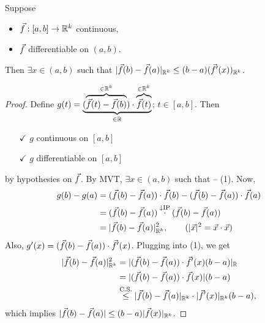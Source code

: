\documentclass[]{article}
\begin{document}
\begin{theorem}
	\label{thm-5-19} Suppose
	\begin{itemize}
		\item $\vf:[a,b]\ra\mb R^k$ continuous,
		\item $\vf$ differentiable on $(a,b)$.
	\end{itemize}
	Then $\exists x\in(a,b)$ such that $|\vf(b)-\vf(a)|_{\mb R^k} \leq (b-a) (\vf'(x))_{\mb R^k}$.
\end{theorem}
\begin{proof}
	Define $g(t) = \ub{\in\mb R}{(\ob{\in\mb R^k}{\vf(t)-\vf(b)})\cdot\ob{\in\mb R^k}{\vf(t)}}$; $t\in[a,b]$.
	Then
	\begin{enumerate}
		\item[$\checkmark$] $g$ continuous on $[a,b]$
		\item[$\checkmark$] $g$ differentiable on $[a,b]$
	\end{enumerate}
	by hypothesies on $\vf$.
	By MVT, $\exists x\in(a,b)$ such that  -- (1).
	Now, 
	\begin{align*}
		g(b)-g(a) &= (\vf(b)-\vf(a))\cdot\vf(b) - (\vf(b)-\vf(a))\cdot\vf(a) \\
				  &= (\vf(b)-\vf(a))\os{\downarrow\text{IP}}\cdot(\vf(b)-\vf(a)) \\
				  &= |\vf(b)-\vf(a)|_{\mb R^k}^2, \qquad (|\vx|^2=\vx\cdot\vx)
	\end{align*}
	Also, $g'(x) = (\vf(b)-\vf(a)) \cdot \vf'(x)$.
	Plugging into (1), we get 
	\begin{align*}
		|\vf(b)-\vf(a)|_{\mb R^k}^2 &= |(\vf(b)-\vf(a))\cdot \vf'(x)(b-a)|_{\mb R} \\
									&= |(\vf(b)-\vf(a))\cdot\vf(x)|(b-a) \\
									&\os{\text{C.S.}}\leq |\vf(b)-\vf(a)|_{\mb R^k}\cdot |\vf'(x)|_{\mb R^k}(b-a),
	\end{align*}
	which implies $|\vf(b)-\vf(a)|\leq(b-a)|\vf(x)|_{\mb R^k}$.
\end{proof}

\iffalse
\begin{example}
	[HW \#4.2]
	$f:[0,\infty)\ra\mb R$ is: $\dots$.
	Show, $g(x) = \frac{f(x)}x$ is monotonically increasing.
\end{example}
\begin{proof}
	Consider $f:[0,\infty)\ra\mb R$ is a continuous function with the given properties.
	Since $f$ is differentiable on $(0,\infty)$, $\exists t\in(0,x)$, $x<\infty$ such that $\frac{f(x)-f(0)}x = f'(t)$ -- (I) by MVT.
	Likewise for the interval $(x,y)$, $y<\infty$, $\exists s$ such that $f'(s) = \frac{f(y)-f(x)}{y-x}$ -- (II).
	So, $s>t$ and by monotonicity of $f'$, $$f'(s)\geq f'(t) \implies \frac{f(y)-f(x)}{y-x} \geq \frac{f(x)}x. $$
	$xf(y) - xf(y) \geq (y-x) f(x) \implies xf(y) \geq y(f(x)$.
	Clai $g(x) = \frac{f(x)}x$ is differentiable: $f(x)$ is differentiable and $I_x$ is differentiable.
	This implies $\frac{f(x)}x$ is differentiable; $x\neq0$.
	So, use MVT on $g(x) = \frac{f(x)}x$ to see, $\exists k\in(x,y)$ such that $g'(k) = \frac{g(y)-g(x)}{y-x} = \frac{\frac{f(y)}y-\frac{f(x)}x}{y-x} = \frac{xf(y)-yf(x)}{xy(y-x)}\geq0$ implies $g(x)$ is monotonic.
\end{proof}
\fi
\end{document}
